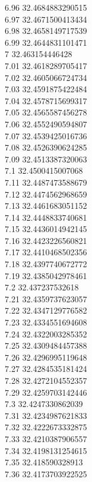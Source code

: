 {6.96	32.4684883290515\\
6.97	32.4671500413434\\
6.98	32.4658149717539\\
6.99	32.4644831101471\\
7	32.463154446428\\
7.01	32.4618289705417\\
7.02	32.4605066724734\\
7.03	32.4591875422484\\
7.04	32.4578715699317\\
7.05	32.4565587456278\\
7.06	32.4552490594807\\
7.07	32.4539425016736\\
7.08	32.4526390624285\\
7.09	32.4513387320063\\
7.1	32.4500415007068\\
7.11	32.4487473588679\\
7.12	32.4474562968659\\
7.13	32.4461683051152\\
7.14	32.4448833740681\\
7.15	32.4436014942145\\
7.16	32.4423226560821\\
7.17	32.4410468502356\\
7.18	32.4397740672772\\
7.19	32.4385042978461\\
7.2	32.437237532618\\
7.21	32.4359737623057\\
7.22	32.4347129776582\\
7.23	32.4334551694608\\
7.24	32.4322003285352\\
7.25	32.4309484457388\\
7.26	32.4296995119648\\
7.27	32.4284535181424\\
7.28	32.4272104552357\\
7.29	32.4259703142446\\
7.3	32.4247330862039\\
7.31	32.4234987621833\\
7.32	32.4222673332875\\
7.33	32.4210387906557\\
7.34	32.4198131254615\\
7.35	32.418590328913\\
7.36	32.4173703922525\\
}
